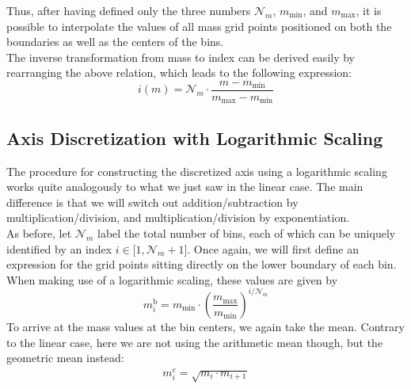         Thus, after having defined only the three numbers $\mathcal N_m$, $m_\text{min}$, and 
        $m_\text{max}$, it is possible to interpolate the values of all mass grid points positioned 
        on both the boundaries as well as the  centers of the bins. \\
        
        The inverse transformation from mass to index can be derived easily by rearranging the 
        above relation, which leads to the following expression:
        \begin{equation}
            i(m)
                =\mathcal N_m\cdot\frac{m-m_\text{min}}{m_\text{max}-m_\text{min}}
        \end{equation}
        
 
    \subsection{Axis Discretization with Logarithmic Scaling}
    \label{subsec:axis_discretization_with_logarithmic_scale}

        The procedure for constructing the discretized axis using a logarithmic scaling works quite
        analogously to what we just saw in the linear case. The main difference is that we will 
        switch out addition/subtraction by multiplication/division, and multiplication/division 
        by exponentiation.
        \\

        As before, let $\mathcal N_m$ label the total number of bins, each of which can be uniquely 
        identified by an index $i\in\mathcal[1,\mathcal N_m+1]$. Once again, we will first define 
        an expression for the grid points sitting directly on the lower boundary of each bin. When
        making use of a logarithmic scaling, these values are given by
        \begin{equation}
            m_i^\text{b}
                =m_\text{min}\cdot\left(\frac{m_\text{max}}{m_\text{min}}\right)^{i/\mathcal N_m}
        \end{equation}
        To arrive at the mass values at the bin centers, we again take the mean. Contrary to the 
        linear case, here we are not using the arithmetic mean though, but the geometric mean
        instead:
        \begin{align}
            m_i^\text{c}
                =\sqrt{m_i\cdot m_{i+1}}
        \end{align}
    
